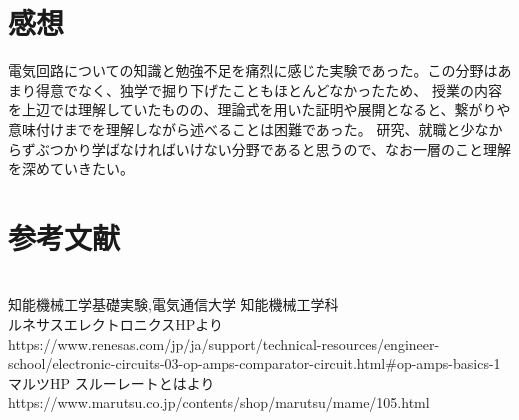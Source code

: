 \documentclass[a4paper,11pt,uplatex]{jsarticle}
\begin{document}
\section{感想}
電気回路についての知識と勉強不足を痛烈に感じた実験であった。この分野はあまり得意でなく、独学で掘り下げたこともほとんどなかったため、
授業の内容を上辺では理解していたものの、理論式を用いた証明や展開となると、繋がりや意味付けまでを理解しながら述べることは困難であった。
研究、就職と少なからずぶつかり学ばなければいけない分野であると思うので、なお一層のこと理解を深めていきたい。
\section{参考文献}
\\ \relax
[1]知能機械工学基礎実験,電気通信大学  知能機械工学科 \\ \relax
[2]ルネサスエレクトロニクスHPより　https://www.renesas.com/jp/ja/support/technical-resources/engineer-school/electronic-circuits-03-op-amps-comparator-circuit.html\#op-amps-basics-1 \\ \relax
[3]マルツHP スルーレートとはより https://www.marutsu.co.jp/contents/shop/marutsu/mame/105.html
\end{document}

